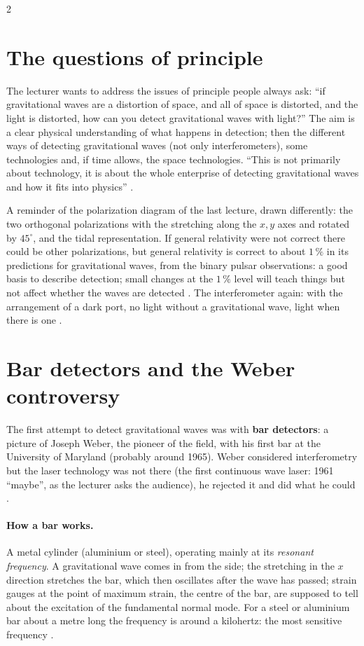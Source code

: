 \begin{paracol}{2}
\section{The questions of principle}\label{sec:c28-intro}

The lecturer wants to address the issues of principle people always ask: ``if gravitational waves are a distortion of space, and all of space is distorted, and the light is distorted, how can you detect gravitational waves with light?'' The aim is a clear physical understanding of what happens in detection; then the different ways of detecting gravitational waves (not only interferometers), some technologies and, if time allows, the space technologies. ``This is not primarily about technology, it is about the whole enterprise of detecting gravitational waves and how it fits into physics'' .

A reminder of the polarization diagram of the last lecture, drawn differently: the two orthogonal polarizations with the stretching along the $x,y$ axes and rotated by $45^\circ$, and the tidal representation. If general relativity were not correct there could be other polarizations, but general relativity is correct to about $1\,\%$ in its predictions for gravitational waves, from the binary pulsar observations: a good basis to describe detection; small changes at the $1\,\%$ level will teach things but not affect whether the waves are detected . The interferometer again: with the arrangement of a dark port, no light without a gravitational wave, light when there is one .

\section{Bar detectors and the Weber controversy}\label{sec:c28-bars}

The first attempt to detect gravitational waves was with \textbf{bar detectors}: a picture of Joseph Weber, the pioneer of the field, with his first bar at the University of Maryland (probably around 1965). Weber considered interferometry but the laser technology was not there (the first continuous wave laser: 1961 ``maybe'', as the lecturer asks the audience), he rejected it and did what he could .

\paragraph{How a bar works.} A metal cylinder (aluminium or steel), operating mainly at its \emph{resonant frequency}. A gravitational wave comes in from the side; the stretching in the $x$ direction stretches the bar, which then oscillates after the wave has passed; strain gauges at the point of maximum strain, the centre of the bar, are supposed to tell about the excitation of the fundamental normal mode. For a steel or aluminium bar about a metre long the frequency is around a kilohertz: the most sensitive frequency .


\end{paracol}
